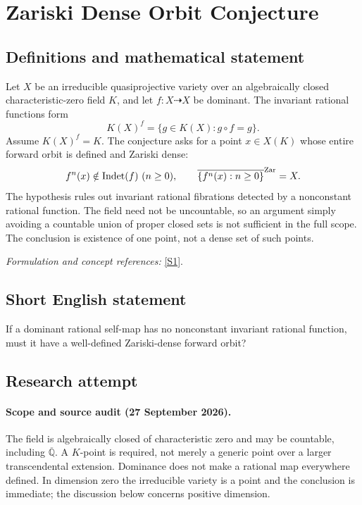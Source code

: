 \documentclass[11pt]{article}
\begin{document}
\section*{\texorpdfstring{Zariski Dense Orbit Conjecture}{Zariski Dense Orbit Conjecture}}\label{484}
\subsection{Definitions and mathematical statement}
Let $X$ be an irreducible quasiprojective variety over an algebraically closed characteristic-zero field $K$, and let $f:X\dashrightarrow X$ be dominant. The invariant rational functions form
\[
 K(X)^f=\{g\in K(X):g\circ f=g\}.
\]
Assume $K(X)^f=K$. The conjecture asks for a point $x\in X(K)$ whose entire forward orbit is defined and Zariski dense:
\[
 f^n(x)\notin\operatorname{Indet}(f)\ (n\ge0),
 \qquad\overline{\{f^n(x):n\ge0\}}^{\rm Zar}=X.
\]
The hypothesis rules out invariant rational fibrations detected by a nonconstant rational function. The field need not be uncountable, so an argument simply avoiding a countable union of proper closed sets is not sufficient in the full scope. The conclusion is existence of one point, not a dense set of such points.
\par\smallskip\textit{Formulation and concept references:} \href{https://personal.math.ubc.ca/~dghioca/papers/conjecture_automorphisms.pdf}{[S1]}.

\subsection{Short English statement}
If a dominant rational self-map has no nonconstant invariant rational function, must it have a well-defined Zariski-dense forward orbit?
\subsection{Research attempt}

\paragraph{Scope and source audit (27 September 2026).}
The field is algebraically closed of characteristic zero and may be
countable, including $\overline{\mathbb Q}$. A $K$-point is required, not
merely a generic point over a larger transcendental extension. Dominance
does not make a rational map everywhere defined. In dimension zero the
irreducible variety is a point and the conclusion is immediate; the
discussion below concerns positive dimension.
\end{document}
